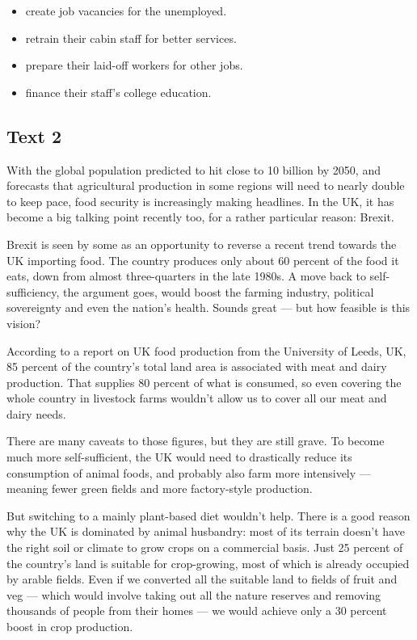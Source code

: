 \documentclass[UTF8,11pt]{ctexart}
\begin{document}
\begin{itemize}[leftmargin=2em,itemsep=.2em,topsep=.4em]\item[A.] create job vacancies for the unemployed.
\item[B.] retrain their cabin staff for better services.
\item[C.] prepare their laid-off workers for other jobs.
\item[D.] finance their staff’s college education.
\end{itemize}

\subsection*{\textbf{Text 2}}


With the global population predicted to hit close to 10 billion by 2050, and forecasts that agricultural production in some regions will need to nearly double to keep pace, food security is increasingly making headlines. In the UK, it has become a big talking point recently too, for a rather particular reason: Brexit.


Brexit is seen by some as an opportunity to reverse a recent trend towards the UK importing food. The country produces only about 60 percent of the food it eats, down from almost three-quarters in the late 1980s. A move back to self-sufficiency, the argument goes, would boost the farming industry, political sovereignty and even the nation’s health. Sounds great — but how feasible is this vision?


According to a report on UK food production from the University of Leeds, UK, 85 percent of the country’s total land area is associated with meat and dairy production. That supplies 80 percent of what is consumed, so even covering the whole country in livestock farms wouldn’t allow us to cover all our meat and dairy needs.


There are many caveats to those figures, but they are still grave. To become much more self-sufficient, the UK would need to drastically reduce its consumption of animal foods, and probably also farm more intensively — meaning fewer green fields and more factory-style production.


But switching to a mainly plant-based diet wouldn’t help. There is a good reason why the UK is dominated by animal husbandry: most of its terrain doesn’t have the right soil or climate to grow crops on a commercial basis. Just 25 percent of the country’s land is suitable for crop-growing, most of which is already occupied by arable fields. Even if we converted all the suitable land to fields of fruit and veg — which would involve taking out all the nature reserves and removing thousands of people from their homes — we would achieve only a 30 percent boost in crop production.
\end{document}
